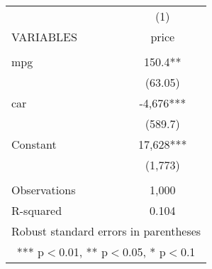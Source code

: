\begin{tabular}{lc} \hline
 & (1) \\
VARIABLES & price \\ \hline
 &  \\
mpg & 150.4** \\
 & (63.05) \\
car & -4,676*** \\
 & (589.7) \\
Constant & 17,628*** \\
 & (1,773) \\
 &  \\
Observations & 1,000 \\
 R-squared & 0.104 \\ \hline
\multicolumn{2}{c}{ Robust standard errors in parentheses} \\
\multicolumn{2}{c}{ *** p$<$0.01, ** p$<$0.05, * p$<$0.1} \\
\end{tabular}
